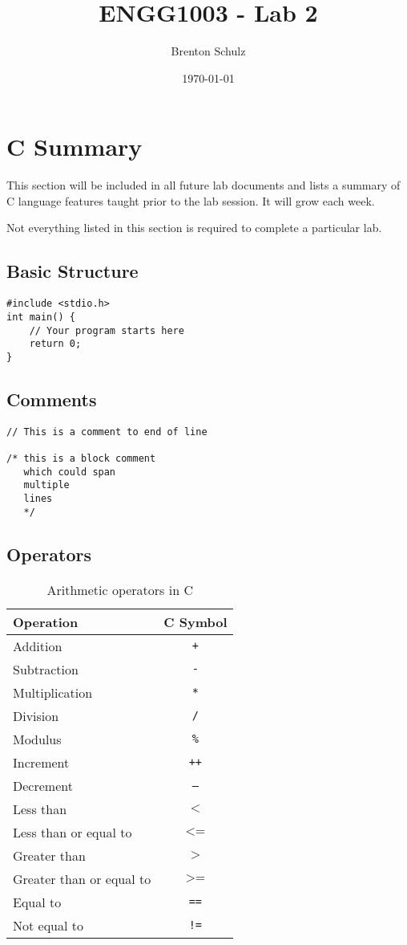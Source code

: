 \documentclass{lab}
\title{ENGG1003 - Lab 2}
\author{Brenton Schulz}
\date{\today}
\begin{document}
\maketitle

\section{C Summary}
This section will be included in all future lab documents and lists a summary of C language features taught prior to the lab session. It will grow each week.

Not everything listed in this section is required to complete a particular lab.

\begin{multicols}{2}
\subsection{Basic Structure}
\begin{lstlisting}[style=CStyle]
#include <stdio.h>
int main() {
	// Your program starts here
	return 0;
}
\end{lstlisting}
\subsection{Comments}
\begin{lstlisting}[style=CStyle]
// This is a comment to end of line

/* this is a block comment
   which could span
   multiple
   lines
   */
\end{lstlisting}

\subsection{Operators}

\begin{table}[H]
\centering
\begin{tabular}{|l|c|}
\hline
Operation      & C Symbol \\
\hline
Addition       & \texttt{+}        \\
Subtraction    & \texttt{-}        \\
Multiplication & \texttt{*}        \\
Division       & \texttt{/}       \\
Modulus		   & \texttt{\%}	\\
Increment	& \texttt{++}	\\
Decrement	& \texttt{--} \\
Less than       & $\texttt{<}$        \\
Less than or equal to    & $\texttt{<=}$\\
Greater than & $\texttt{>}$        \\
Greater than or equal to       & $\texttt{>=}$ \\
Equal to & \texttt{==} \\
Not equal to & \texttt{!=} \\
\hline
\end{tabular}
\caption{Arithmetic operators in C}
\end{table}


\end{multicols}
\end{document}
